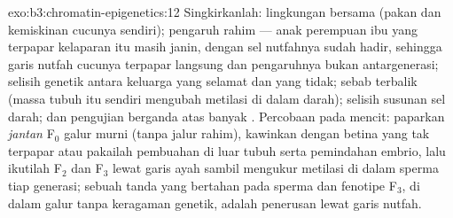 \begin{solution}{exo:b3:chromatin-epigenetics:12}
Singkirkanlah: lingkungan bersama (pakan dan kemiskinan cucunya sendiri);
pengaruh rahim --- anak perempuan ibu yang terpapar kelaparan itu masih
janin, dengan sel nutfahnya sudah hadir, sehingga garis nutfah cucunya
terpapar langsung dan pengaruhnya bukan antargenerasi; selisih genetik antara
keluarga yang selamat dan yang tidak; sebab terbalik (massa tubuh itu sendiri
mengubah metilasi di dalam darah); selisih susunan sel darah; dan pengujian
berganda atas banyak . Percobaan pada mencit: paparkan \emph{jantan}
F$_0$ galur murni (tanpa jalur rahim), kawinkan dengan betina yang tak
terpapar atau pakailah pembuahan di luar tubuh serta pemindahan embrio, lalu
ikutilah F$_2$ dan F$_3$ lewat garis ayah sambil mengukur metilasi di dalam sperma
tiap generasi; sebuah tanda yang bertahan pada sperma dan fenotipe F$_3$,
di dalam galur tanpa keragaman genetik, adalah penerusan lewat garis nutfah.
\end{solution}

